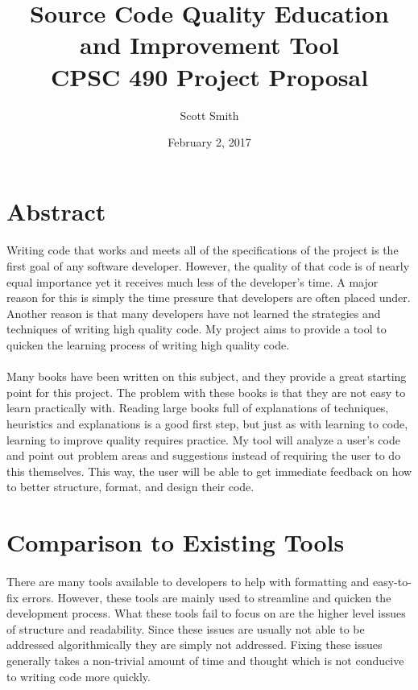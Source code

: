 \documentclass{article}
\title{%
	Source Code Quality Education and Improvement Tool \\
	\large CPSC 490 Project Proposal}
\date{February 2, 2017}
\author{Scott Smith}
\begin{document}
\maketitle
\newpage

\section{Abstract}
\paragraph{}
Writing code that works and meets all of the specifications of the project is the first goal of any software developer. However, the quality of that code is of nearly equal importance yet it receives much less of the developer's time. A major reason for this is simply the time pressure that developers are often placed under. Another reason is that many developers have not learned the strategies and techniques of writing high quality code. My project aims to provide a tool to quicken the learning process of writing high quality code.
\paragraph{} 
Many books have been written on this subject, and they provide a great starting point for this project. The problem with these books is that they are not easy to learn practically with. Reading large books full of explanations of techniques, heuristics and explanations is a good first step, but just as with learning to code, learning to improve quality requires practice. My tool will analyze a user's code and point out problem areas and suggestions instead of requiring the user to do this themselves. This way, the user will be able to get immediate feedback on how to better structure, format, and design their code.

\section{Comparison to Existing Tools}
\paragraph{} 
There are many tools available to developers to help with formatting and easy-to-fix errors. However, these tools are mainly used to streamline and quicken the development process. What these tools fail to focus on are the higher level issues of structure and readability. Since these issues are usually not able to be addressed algorithmically they are simply not addressed. Fixing these issues generally takes a non-trivial amount of time and thought which is not conducive to writing code more quickly.
\end{document}
